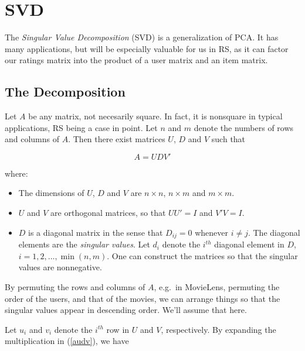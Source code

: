 \section{SVD}

The \textit{Singular Value Decomposition} (SVD) is a generalization 
of PCA.  It has many applications, but will be especially valuable for
us in RS, as it can factor our ratings matrix into the product of a user
matrix and an item matrix.

\subsection{The Decomposition}

Let $A$ be any matrix, not necesarily square.  In fact, it is nonsquare
in typical applications, RS being a case in point.  Let $n$ and $m$
denote the numbers of rows and columns of $A$.
Then there exist matrices $U$, $D$ and $V$ such that

\begin{equation}
\label{audv}
A = U D V'
\end{equation}

where:

\begin{itemize}

\item The dimensions of $U$, $D$ and $V$ are $n \times n$, $n \times m$
and $m \times m$.

\item $U$ and $V$ are orthogonal matrices, so that $U U' = I$ and $V'V =
I$.

\item $D$ is a diagonal matrix in the sense that $D_{ij} = 0$ whenever
$i \neq j$.  The diagonal elements are the \textit{singular values}.
Let $d_{i}$ denote the $i^{th}$ diagonal element in $D$,
$i = 1,2,...,\min(n,m)$.  One can construct the matrices so that the
singular values are nonnegative.

\end{itemize} 

By permuting the rows and columns of $A$, e.g.\ in MovieLens, permuting
the order of the users, and that of the movies, we can arrange things so
that the singular values appear in descending order.  We'll assume that
here.

Let $u_i$ and $v_i$ denote the $i^{th}$ row in $U$ and $V$, 
respectively.  By expanding the multiplication in (\ref{audv}), we have

